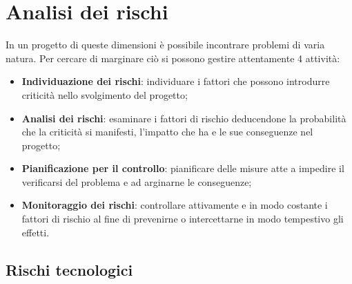 \section{Analisi dei rischi}

In un progetto di queste dimensioni è possibile incontrare problemi di varia natura. Per cercare di marginare ciò si possono gestire attentamente 4 attività:

\begin{itemize}
	\item \textbf{Individuazione dei rischi}: individuare i fattori che possono introdurre criticità nello svolgimento del progetto;
	\item \textbf{Analisi dei rischi}: esaminare i fattori di rischio deducendone la probabilità che la criticità si manifesti, l'impatto che ha e le sue conseguenze nel progetto;
	\item \textbf{Pianificazione per il controllo}: pianificare delle misure atte a impedire il verificarsi del problema e ad arginarne le conseguenze;
	\item \textbf{Monitoraggio dei rischi}: controllare attivamente e in modo costante i fattori di rischio al fine di prevenirne o intercettarne in modo tempestivo gli effetti.
\end{itemize}


\subsection{Rischi tecnologici}




